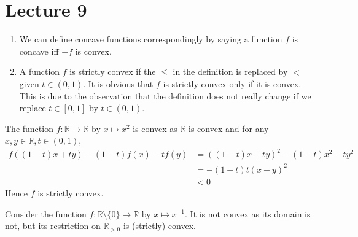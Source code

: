 \documentclass{article}
\begin{document}
\part*{Lecture 9}
\begin{remark}
    \begin{enumerate}
        \item We can define concave functions correspondingly by saying a function $f$ is concave iff $-f$ is convex.
        \item A function $f$ is strictly convex if the $\le$ in the definition is replaced by $<$ given $t\in (0,1)$.
        It is obvious that $f$ is strictly convex only if it is convex.
        This is due to the observation that the definition does not really change if we replace $t\in[0,1]$ by $t\in(0,1)$.
    \end{enumerate}
\end{remark}
\begin{example}
    The function $f:\mathbb R\to\mathbb R$ by $x\mapsto x^2$ is convex as $\mathbb R$ is convex and for any $x,y\in\mathbb R,t\in (0,1)$,
    \begin{align*}
        f((1-t)x+ty)-(1-t)f(x)-tf(y)&=((1-t)x+ty)^2-(1-t)x^2-ty^2\\
        &=-(1-t)t(x-y)^2\\
        &<0
    \end{align*}
    Hence $f$ is strictly convex.
\end{example}
\begin{example}
    Consider the function $f:\mathbb R\setminus\{0\}\to\mathbb R$ by $x\mapsto x^{-1}$.
    It is not convex as its domain is not, but its restriction on $\mathbb R_{>0}$ is (strictly) convex.
\end{example}
\end{document}
